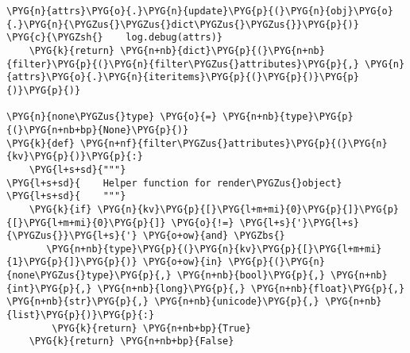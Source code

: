 \begin{Verbatim}[commandchars=\\\{\}]
    \PYG{n}{attrs}\PYG{o}{.}\PYG{n}{update}\PYG{p}{(}\PYG{n}{obj}\PYG{o}{.}\PYG{n}{\PYGZus{}\PYGZus{}dict\PYGZus{}\PYGZus{}}\PYG{p}{)}
\PYG{c}{\PYGZsh{}    log.debug(attrs)}
    \PYG{k}{return} \PYG{n+nb}{dict}\PYG{p}{(}\PYG{n+nb}{filter}\PYG{p}{(}\PYG{n}{filter\PYGZus{}attributes}\PYG{p}{,} \PYG{n}{attrs}\PYG{o}{.}\PYG{n}{iteritems}\PYG{p}{(}\PYG{p}{)}\PYG{p}{)}\PYG{p}{)}

\PYG{n}{none\PYGZus{}type} \PYG{o}{=} \PYG{n+nb}{type}\PYG{p}{(}\PYG{n+nb+bp}{None}\PYG{p}{)}
\PYG{k}{def} \PYG{n+nf}{filter\PYGZus{}attributes}\PYG{p}{(}\PYG{n}{kv}\PYG{p}{)}\PYG{p}{:}
    \PYG{l+s+sd}{"""}
\PYG{l+s+sd}{    Helper function for render\PYGZus{}object}
\PYG{l+s+sd}{    """}
    \PYG{k}{if} \PYG{n}{kv}\PYG{p}{[}\PYG{l+m+mi}{0}\PYG{p}{]}\PYG{p}{[}\PYG{l+m+mi}{0}\PYG{p}{]} \PYG{o}{!=} \PYG{l+s}{'}\PYG{l+s}{\PYGZus{}}\PYG{l+s}{'} \PYG{o+ow}{and} \PYGZbs{}
       \PYG{n+nb}{type}\PYG{p}{(}\PYG{n}{kv}\PYG{p}{[}\PYG{l+m+mi}{1}\PYG{p}{]}\PYG{p}{)} \PYG{o+ow}{in} \PYG{p}{(}\PYG{n}{none\PYGZus{}type}\PYG{p}{,} \PYG{n+nb}{bool}\PYG{p}{,} \PYG{n+nb}{int}\PYG{p}{,} \PYG{n+nb}{long}\PYG{p}{,} \PYG{n+nb}{float}\PYG{p}{,} \PYG{n+nb}{str}\PYG{p}{,} \PYG{n+nb}{unicode}\PYG{p}{,} \PYG{n+nb}{list}\PYG{p}{)}\PYG{p}{:}
        \PYG{k}{return} \PYG{n+nb+bp}{True}
    \PYG{k}{return} \PYG{n+nb+bp}{False}
\end{Verbatim}


